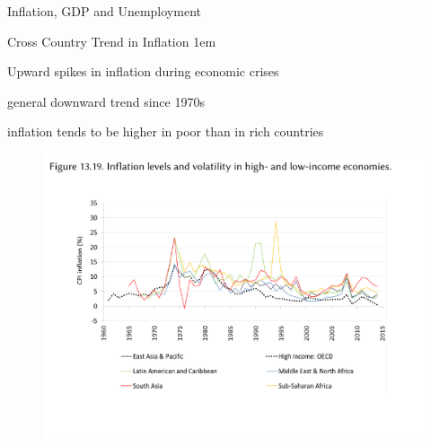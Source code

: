 \documentclass[11pt,aspectratio=43,usenames,dvipsnames]{beamer}
\let\olditemize=\itemize
\let\endolditemize=\enditemize
\renewenvironment{itemize}{\olditemize \itemsep1em}{\endolditemize}
\theoremstyle{definition}
\begin{document}
\begin{frame}{Inflation, GDP and Unemployment}
\end{frame}

\begin{frame}{Cross Country Trend in Inflation}
\label{slide:Cross_Country_Trend_in_Inflation}
    \begin{itemize}
        \item<only@1> Upward spikes in inflation during economic crises
        \item<only@2> general downward trend since 1970s
        \item<only@3> inflation tends to be higher in poor than in rich countries
    \end{itemize}
    \begin{figure}
        \centering
        \includegraphics[width=.9\textwidth]{./figures/15.pdf}
    \end{figure}

\end{frame}
\end{document}
